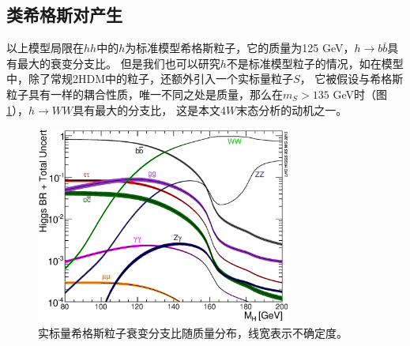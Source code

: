 \subsection{类希格斯对产生}
以上模型局限在$hh$中的$h$为标准模型希格斯粒子，它的质量为125 GeV，$h\rightarrow b\bar{b}$具有最大的衰变分支比。
但是我们也可以研究$h$不是标准模型粒子的情况，如在模型\cite{ExoticHiggsTheory}中，除了常规2HDM中的粒子，还额外引入一个实标量粒子$S$，
它被假设与希格斯粒子具有一样的耦合性质，唯一不同之处是质量，那么在$m_S>135$ GeV时（图\ref{fig:SM-HIGGS-BR}），$h\rightarrow WW$具有最大的分支比，
这是本文4$W$末态分析的动机之一。
\begin{figure}
\centering
 \includegraphics[width=0.75\textwidth]{fig/Higgs_BR_LM_RECT.eps}
 \caption{实标量希格斯粒子衰变分支比随质量分布，线宽表示不确定度。\cite{SM-HIGGS-BR}}
 \label{fig:SM-HIGGS-BR}
\end{figure}
%
